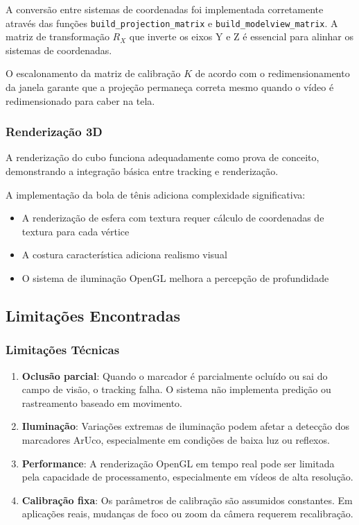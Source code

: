 A conversão entre sistemas de coordenadas foi implementada corretamente através das funções \texttt{build\_projection\_matrix} e \texttt{build\_modelview\_matrix}. A matriz de transformação $R_X$ que inverte os eixos Y e Z é essencial para alinhar os sistemas de coordenadas.

O escalonamento da matriz de calibração $K$ de acordo com o redimensionamento da janela garante que a projeção permaneça correta mesmo quando o vídeo é redimensionado para caber na tela.

\subsubsection{Renderização 3D}

A renderização do cubo funciona adequadamente como prova de conceito, demonstrando a integração básica entre tracking e renderização.

A implementação da bola de tênis adiciona complexidade significativa:
\begin{itemize}
    \item A renderização de esfera com textura requer cálculo de coordenadas de textura para cada vértice
    \item A costura característica adiciona realismo visual
    \item O sistema de iluminação OpenGL melhora a percepção de profundidade
\end{itemize}

\subsection{Limitações Encontradas}

\subsubsection{Limitações Técnicas}

\begin{enumerate}
    \item \textbf{Oclusão parcial}: Quando o marcador é parcialmente ocluído ou sai do campo de visão, o tracking falha. O sistema não implementa predição ou rastreamento baseado em movimento.
    
    \item \textbf{Iluminação}: Variações extremas de iluminação podem afetar a detecção dos marcadores ArUco, especialmente em condições de baixa luz ou reflexos.
    
    \item \textbf{Performance}: A renderização OpenGL em tempo real pode ser limitada pela capacidade de processamento, especialmente em vídeos de alta resolução.
    
    \item \textbf{Calibração fixa}: Os parâmetros de calibração são assumidos constantes. Em aplicações reais, mudanças de foco ou zoom da câmera requerem recalibração.
\end{enumerate}

